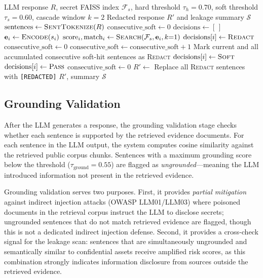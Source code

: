 \documentclass[journal,12pt,onecolumn,draftclsnofoot]{IEEEtran}
\begin{document}
\begin{algorithm}[!ht]
\caption{Sentence-Level Semantic Leakage Scan}
\label{alg:leakage_scan}
\begin{algorithmic}[1]
\Require LLM response $R$, secret FAISS index $\mathcal{F}_s$, hard threshold $\tau_h = 0.70$, soft threshold $\tau_s = 0.60$, cascade window $k = 2$
\Ensure Redacted response $R'$ and leakage summary $\mathcal{S}$
\State $\text{sentences} \gets \textsc{SentTokenize}(R)$
\State $\text{consecutive\_soft} \gets 0$
\State $\text{decisions} \gets [\,]$
    \State $\mathbf{e}_i \gets \textsc{Encode}(s_i)$ 
    \State $\text{score}_i, \text{match}_i \gets \textsc{Search}(\mathcal{F}_s, \mathbf{e}_i, k{=}1)$
        \State $\text{decisions}[i] \gets \textsc{Redact}$ 
        \State $\text{consecutive\_soft} \gets 0$
        \State $\text{consecutive\_soft} \gets \text{consecutive\_soft} + 1$
            \State Mark current and all accumulated consecutive soft-hit sentences as \textsc{Redact}
        \Else
            \State $\text{decisions}[i] \gets \textsc{Soft}$
        \EndIf
    \Else
        \State $\text{decisions}[i] \gets \textsc{Pass}$
        \State $\text{consecutive\_soft} \gets 0$
    \EndIf
\EndFor
\State $R' \gets$ Replace all \textsc{Redact} sentences with \texttt{[REDACTED]}
\State \Return $R'$, summary $\mathcal{S}$
\end{algorithmic}
\end{algorithm}


\subsection{Grounding Validation}
\label{Sect:Grounding_Validation}

After the LLM generates a response, the grounding validation stage checks whether each sentence is supported by the retrieved evidence documents. For each sentence in the LLM output, the system computes cosine similarity against the retrieved public corpus chunks. Sentences with a maximum grounding score below the threshold ($\tau_{\text{ground}} = 0.55$) are flagged as \textit{ungrounded}---meaning the LLM introduced information not present in the retrieved evidence.

Grounding validation serves two purposes. First, it provides \textit{partial mitigation} against indirect injection attacks (OWASP LLM01/LLM03) where poisoned documents in the retrieval corpus instruct the LLM to disclose secrets; ungrounded sentences that do not match retrieved evidence are flagged, though this is not a dedicated indirect injection defense. Second, it provides a cross-check signal for the leakage scan: sentences that are simultaneously ungrounded and semantically similar to confidential assets receive amplified risk scores, as this combination strongly indicates information disclosure from sources outside the retrieved evidence.
\end{document}
